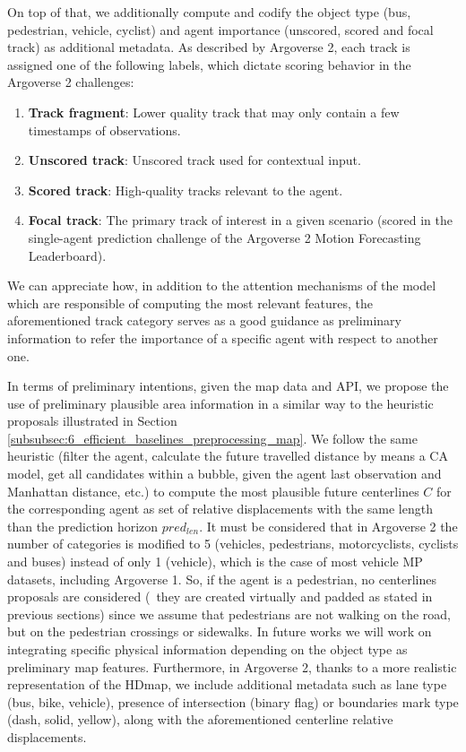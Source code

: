 On top of that, we additionally compute and codify the object type (bus, pedestrian, vehicle, cyclist) and agent importance (unscored, scored and focal track) as additional metadata. As described by Argoverse 2, each track is assigned one of the following labels, which dictate scoring behavior in the Argoverse 2 challenges:

\begin{enumerate}
	\item \textbf{Track fragment}: Lower quality track that may only contain a few timestamps of observations.
	\item \textbf{Unscored track}: Unscored track used for contextual input.
	\item \textbf{Scored track}: High-quality tracks relevant to the agent.
	\item \textbf{Focal track}: The primary track of interest in a given scenario (scored in the single-agent prediction challenge of the Argoverse 2 Motion Forecasting Leaderboard).
\end{enumerate}

We can appreciate how, in addition to the attention mechanisms of the model which are responsible of computing the most relevant features, the aforementioned track category serves as a good guidance as preliminary information to refer the importance of a specific agent with respect to another one.

In terms of preliminary intentions, given the map data and API, we propose the use of preliminary plausible area information in a similar way to the heuristic proposals illustrated in Section \ref{subsubsec:6_efficient_baselines_preprocessing_map}. We follow the same heuristic (filter the agent, calculate the future travelled distance by means a \ac{CA} model, get all candidates within a bubble, given the agent last observation and Manhattan distance, etc.) to compute the most plausible future centerlines $C$ for the corresponding agent as set of relative displacements with the same length than the prediction horizon $pred_{len}$. It must be considered that in Argoverse 2 the number of categories is modified to 5 (vehicles, pedestrians, motorcyclists, cyclists and buses) instead of only 1 (vehicle), which is the case of most vehicle \ac{MP} datasets, including Argoverse 1. So, if the agent is a pedestrian, no centerlines proposals are considered (\ie \ they are created virtually and padded as stated in previous sections) since we assume that pedestrians are not walking on the road, but on the pedestrian crossings or sidewalks. In future works we will work on integrating specific physical information depending on the object type as preliminary map features. Furthermore, in Argoverse 2, thanks to a more realistic representation of the \ac{HDmap}, we include additional metadata such as lane type (bus, bike, vehicle), presence of intersection (binary flag) or boundaries mark type (dash, solid, yellow), along with the aforementioned centerline relative displacements. 

